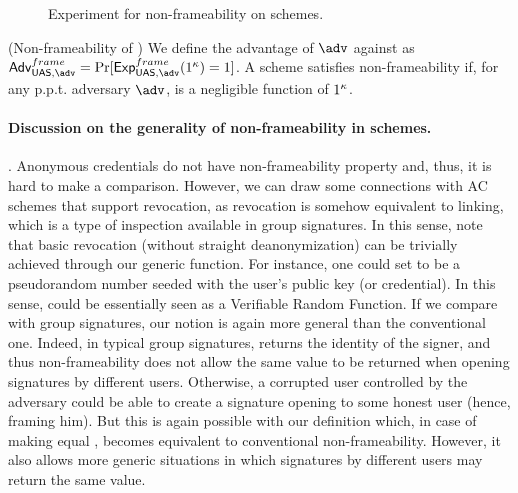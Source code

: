 \begin{figure}[htp!]
  \caption{Experiment for non-frameability on \UAS schemes.}
  \label{fig:exp-uas-frame}
\end{figure}

\begin{definition}{(Non-frameability of \UAS)}
  We define the advantage \AdvNonframe of $\adv$ against \ExpNonframe as
  $\AdvNonframe=\Pr\lbrack\ExpNonframe(1^\secpar)=1\rbrack$.
  A \GSAC scheme satisfies non-frameability if, for any p.p.t. adversary $\adv$,
  \AdvNonframe is a negligible function of $1^\kappa$.
\end{definition}

\paragraph{Discussion on the generality of non-frameability in \UAS schemes.} %
.
Anonymous credentials do not have non-frameability property and, thus, it is
hard to make a comparison. However, we can draw some connections with AC schemes
that support revocation, as revocation is somehow equivalent to linking, which
is a type of inspection available in group signatures. In this sense, note that
basic revocation (without straight deanonymization) can be trivially achieved
through our generic \Inspect function. For instance, one could set \finsp to
be a pseudorandom number seeded with the user's public key (or credential). In
this sense, \Inspect could be essentially seen as a Verifiable Random Function.
If we compare with group signatures, our notion is again more general than the
conventional one. Indeed, in typical group signatures, \Open returns the
identity of the signer, and thus non-frameability does not allow the same value
to be returned when opening signatures by different users. Otherwise, a
corrupted user controlled by the adversary could be able to create a signature
opening to some honest user (hence, framing him). But this is again possible
with our definition which, in case of making \Inspect equal \Open, becomes
equivalent to conventional non-frameability. However, it also allows more
generic situations in which signatures by different users may return the same
value. 
  
